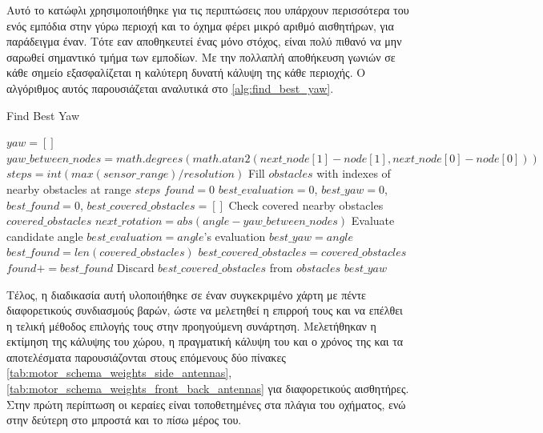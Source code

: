Αυτό το κατώφλι χρησιμοποιήθηκε για τις περιπτώσεις που υπάρχουν περισσότερα του ενός εμπόδια στην γύρω περιοχή και το όχημα φέρει μικρό αριθμό αισθητήρων, για παράδειγμα έναν. Τότε εαν αποθηκευτεί ένας μόνο στόχος, είναι πολύ πιθανό να μην σαρωθεί σημαντικό τμήμα των εμποδίων. Με την πολλαπλή αποθήκευση γωνιών σε κάθε σημείο εξασφαλίζεται η καλύτερη δυνατή κάλυψη της κάθε περιοχής. Ο αλγόριθμος αυτός παρουσιάζεται αναλυτικά στο \ref{alg:find_best_yaw}.  

\begin{algorithm}[!h]
\caption{Find Best Yaw}
\label{alg:find_best_yaw}
\begin{algorithmic}[1]
        \State $yaw = []$
        \State $yaw\_between\_nodes = math.degrees(math.atan2(next\_node[1]-node[1], next\_node[0]-node[0]))$
        \State $steps = int(max(sensor\_range) / resolution)$
        \State Fill $obstacles$ with indexes of nearby obstacles at range $steps$
        \State $found = 0$
            \State $best\_evaluation = 0$, $best\_yaw = 0$, $best\_found = 0$, $best\_covered\_obstacles = []$
                \State Check covered nearby obstacles $covered\_obstacles$
                \State $next\_rotation = abs(angle - yaw\_between\_nodes)$
                \State Evaluate candidate angle
                    \State $best\_evaluation = angle$'s evaluation
                    \State $best\_yaw = angle$
                    \State $best\_found = len(covered\_obstacles)$ 
                    \State $best\_covered\_obstacles = covered\_obstacles$
                \EndIf
            \EndFor
            \State $found += best\_found$
            \State Discard $best\_covered\_obstacles$ from $obstacles$
        \EndWhile
        \State \Return $best\_yaw$
\end{algorithmic}
\end{algorithm}



Τέλος, η διαδικασία αυτή υλοποιήθηκε σε έναν συγκεκριμένο χάρτη με πέντε διαφορετικούς συνδιασμούς βαρών, ώστε να μελετηθεί η επιρροή τους και να επέλθει η τελική μέθοδος επιλογής τους στην προηγούμενη συνάρτηση. Μελετήθηκαν η εκτίμηση της κάλυψης του χώρου, η πραγματική κάλυψη του και ο χρόνος της και τα αποτελέσματα παρουσιάζονται στους επόμενους δύο πίνακες \ref{tab:motor_schema_weights_side_antennas}, \ref{tab:motor_schema_weights_front_back_antennas} για διαφορετικούς αισθητήρες. Στην πρώτη περίπτωση οι κεραίες είναι τοποθετημένες στα πλάγια του οχήματος, ενώ στην δεύτερη στο μπροστά και το πίσω μέρος του. 

